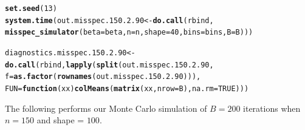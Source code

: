 \documentclass[11pt]{article}\usepackage[]{graphicx}\usepackage[]{color}
\makeatletter
\newcommand{\hlnum}[1]{\textcolor[rgb]{0.686,0.059,0.569}{#1}}%
\newcommand{\hlstd}[1]{\textcolor[rgb]{0.345,0.345,0.345}{#1}}%
\newcommand{\hlkwa}[1]{\textcolor[rgb]{0.161,0.373,0.58}{\textbf{#1}}}%
\newcommand{\hlkwb}[1]{\textcolor[rgb]{0.69,0.353,0.396}{#1}}%
\newcommand{\hlkwc}[1]{\textcolor[rgb]{0.333,0.667,0.333}{#1}}%
\newcommand{\hlkwd}[1]{\textcolor[rgb]{0.737,0.353,0.396}{\textbf{#1}}}%
\newenvironment{kframe}{%
 \def\at@end@of@kframe{}%
 \ifinner\ifhmode%
  \def\at@end@of@kframe{\end{minipage}}%
  \begin{minipage}{\columnwidth}%
 \fi\fi%
 \def\FrameCommand##1{\hskip\@totalleftmargin \hskip-\fboxsep
 \colorbox{shadecolor}{##1}\hskip-\fboxsep
     \hskip-\linewidth \hskip-\@totalleftmargin \hskip\columnwidth}%
 \MakeFramed {\advance\hsize-\width
   \@totalleftmargin\z@ \linewidth\hsize
   \@setminipage}}%
 {\par\unskip\endMakeFramed%
 \at@end@of@kframe}
\newenvironment{knitrout}{}{} %
\makeatother
\begin{document}
\begin{knitrout}
\color{fgcolor}\begin{kframe}
\begin{alltt}
\hlkwd{set.seed}\hlstd{(}\hlnum{13}\hlstd{)}
\hlkwd{system.time}\hlstd{(out.misspec.150.2.90} \hlkwb{<-} \hlkwd{do.call}\hlstd{(rbind,}
  \hlkwd{misspec_simulator}\hlstd{(}\hlkwc{beta} \hlstd{= beta,} \hlkwc{n} \hlstd{= n,} \hlkwc{shape} \hlstd{=} \hlnum{40}\hlstd{,} \hlkwc{bins} \hlstd{= bins,} \hlkwc{B} \hlstd{= B)))}
\end{alltt}


{\ttfamily\noindent\bfseries\color{errorcolor}{\#\# Error in chol.default(crossprod(x) + lambda[j] * diag(v)): the leading minor of order 5 is not positive definite}}

{\ttfamily\noindent\itshape\color{messagecolor}{\#\# Timing stopped at: 0.72 0 0.719}}\begin{alltt}
\hlstd{diagnostics.misspec.150.2.90} \hlkwb{<-} \hlkwd{do.call}\hlstd{(rbind,} \hlkwd{lapply}\hlstd{(}\hlkwd{split}\hlstd{(out.misspec.150.2.90,}
  \hlkwc{f} \hlstd{=} \hlkwd{as.factor}\hlstd{(}\hlkwd{rownames}\hlstd{(out.misspec.150.2.90))),}
  \hlkwc{FUN} \hlstd{=} \hlkwa{function}\hlstd{(}\hlkwc{xx}\hlstd{)} \hlkwd{colMeans}\hlstd{(}\hlkwd{matrix}\hlstd{(xx,} \hlkwc{nrow} \hlstd{= B),} \hlkwc{na.rm} \hlstd{=} \hlnum{TRUE}\hlstd{)))}
\end{alltt}


{\ttfamily\noindent\bfseries\color{errorcolor}{\#\# Error in split(out.misspec.150.2.90, f = as.factor(rownames(out.misspec.150.2.90))): object 'out.misspec.150.2.90' not found}}\end{kframe}
\end{knitrout}


The following performs our Monte Carlo simulation of $B = 200$ iterations 
when $n = 150$ and shape = $100$.
\end{document}
